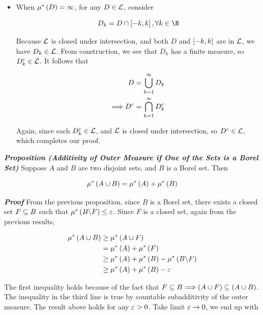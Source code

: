 \documentclass[
]{article}
\begin{document}
\begin{itemize}
\begin{itemize}
    \[\ba
    \mu^*\pr{D^c\c G^c} & = \mu^*\pr{G\c D} \\
    & \le \mu^*\pr{G\c F} \\
    & = \mu^*\pr{G}-\mu^*\pr{F} \\
    & =\pr{\mu^*\pr{G}-\mu^*\pr{D}}+\pr{\mu^*\pr{D}-\mu^*\pr{F}}\\
    & \le \frac{\ve}2+\mu^*\pr{D\c F}\\
    & \le \frac{\ve}2+\frac{\ve}2 = \ve
    \ea\]

    Note that the equality in the second line comes from additivity of
    outer measure when one of the sets is closed, and the fourth line
    above uses subadditivity applied to the union
    \(D = \pr{D\c F}\cup F\).
  \item
    When \(\mu^*\left(D\right) = \infty\), for any \(D\in \mathcal L\), consider

    \[D_k = D\cap \br{-k,k},\forall k\in \N\]

    Because \(\mathcal L\) is closed under intersection, and both \(D\) and
    \(\left[-k,k\right]\) are in \(\mathcal L\), we have \(D_k\in \mathcal L\). From
    construction, we see that \(D_k\) has a finite measure, so
    \(D_k^c\in \mathcal L\). It follows that

    \[\begin{aligned}
    D & = \bigcup_{{k} = 1}^{\infty} D_k\\
    \Longrightarrow D^c & = \bigcap_{{k} = 1}^{\infty} D_k^c
    \end{aligned}\]

    Again, since each \(D_k^c\in \mathcal L\), and \(\mathcal L\) is closed under
    intersection, so \(D^c\in \mathcal L\), which completes our proof.
  \end{itemize}
\end{itemize}

\emph{\textbf{Proposition (Additivity of Outer Measure if One of the
Sets is a Borel Set)}} Suppose \(A\) and \(B\) are two disjoint sets,
and \(B\) is a Borel set. Then

\[\mu^*\left(A\cup B\right) = \mu^*\left(A\right)+\mu^*\left(B\right)\]

\emph{\textbf{Proof}} From the previous proposition, since \(B\) is a
Borel set, there exists a closed set \(F\subseteq B\) such that
\(\mu^*\left(B\backslash F\right)\le\varepsilon\). Since \(F\) is a closed set, again from the
previous results,

\[\begin{aligned}
\mu^*\left(A\cup B\right)& \ge \mu^*\left(A\cup F\right) \\
& = \mu^*\left(A\right)+\mu^*\left(F\right)\\
& \ge \mu^*\left(A\right)+\mu^*\left(B\right)-\mu^*\left(B\backslash F\right)\\
& \ge \mu^*\left(A\right)+\mu^*\left(B\right)-\varepsilon
\end{aligned}\]

The first inequality holds because of the fact that
\(F\subseteq B\Longrightarrow \left(A\cup F\right)\subseteq\left(A\cup B\right)\). The inequality in the third
line is true by countable subadditivity of the outer measure. The result
above holds for any \(\varepsilon>0\). Take limit \(\varepsilon\to 0\), we end up with
\end{document}
